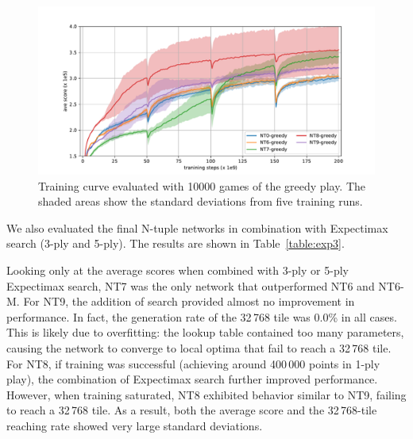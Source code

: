\begin{figure}
 \includegraphics[width=.95\linewidth]{figures/plot-exp2.pdf}
 \caption{Training curve evaluated with 10000 games of the greedy play. The shaded areas show the standard deviations from five training runs.}
 \label{fig:exp2}
\end{figure}

We also evaluated the final N-tuple networks in combination with Expectimax search (3-ply and 5-ply).
The results are shown in Table~\ref{table:exp3}.

Looking only at the average scores when combined with 3-ply or 5-ply Expectimax search, NT7 was the only network that outperformed NT6 and NT6-M.
For NT9, the addition of search provided almost no improvement in performance. In fact, the generation rate of the 32\,768 tile was 0.0\% in all cases. This is likely due to overfitting: the lookup table contained too many parameters, causing the network to converge to local optima that fail to reach a 32\,768 tile.
For NT8, if training was successful (achieving around 400\,000 points in 1-ply play), the combination of Expectimax search further improved performance. However, when training saturated, NT8 exhibited behavior similar to NT9, failing to reach a 32\,768 tile. As a result, both the average score and the 32\,768-tile reaching rate showed very large standard deviations.

